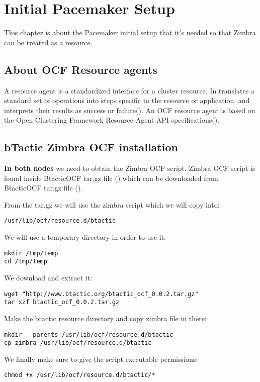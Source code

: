 

\chapter{Initial Pacemaker Setup}
\label{chap:initial-pacemaker-setup}
This chapter is about the Pacemaker initial setup that it's needed so that Zimbra can be treated as a resource.

\section {About OCF Resource agents}
A resource agent is a standardized interface for a cluster resource. In translates a standard set of operations into steps specific to the resource or application, and interprets their results as success or failure(\cite{ResourceAgentsWiki}). An OCF resource agent is based on the Open Clustering Framework Resource Agent API specifications(\cite{OCFResourceAgentsWiki}). 

\section {bTactic Zimbra OCF installation}
\textbf{In both nodes} we need to obtain the Zimbra OCF script. Zimbra OCF script is found inside BtacticOCF tar.gz file (\cite{BtacticOCF}) which can be downloaded from BtacticOCF  tar.gz file (\cite{BtacticOrg}).

From the tar.gz we will use the zimbra script which we will copy into:
\begin{verbatim}
/usr/lib/ocf/resource.d/btactic
\end{verbatim}

We will use a temporary directory in order to use it:
\begin{verbatim}
mkdir /tmp/temp
cd /tmp/temp
\end{verbatim}
We download and extract it:
\begin{verbatim}
wget "http://www.btactic.org/btactic_ocf_0.0.2.tar.gz"
tar xzf btactic_ocf_0.0.2.tar.gz
\end{verbatim}
Make the btactic resource directory and copy zimbra file in there:
\begin{verbatim}
mkdir --parents /usr/lib/ocf/resource.d/btactic
cp zimbra /usr/lib/ocf/resource.d/btactic
\end{verbatim}
We finally make sure to give the script executable permissions:
\begin{verbatim}
chmod +x /usr/lib/ocf/resource.d/btactic/*
\end{verbatim}

